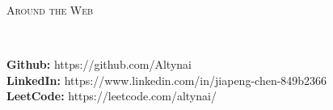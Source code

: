 ﻿\documentclass[9pt]{article}
\newenvironment{changemargin}[2]{%
  \begin{list}{}{%
    \setlength{\topsep}{0pt}%
    \setlength{\leftmargin}{#1}%
    \setlength{\rightmargin}{#2}%
    \setlength{\listparindent}{\parindent}%
    \setlength{\itemindent}{\parindent}%
    \setlength{\parsep}{\parskip}%
  }%
  \item[]}{\end{list}
}
\newcommand{\lineover}{
	\begin{changemargin}{-0.05in}{-0.05in}
		\vspace*{-8pt}
		\hrulefill \\
		\vspace*{-2pt}
	\end{changemargin}
}
\newcommand{\header}[1]{
	\begin{changemargin}{-0.5in}{-0.5in}
		\scshape{#1}\\
  	\lineover
	\end{changemargin}
}
\newenvironment{body} {
	\vspace*{-16pt}
	\begin{changemargin}{-0.25in}{-0.5in}
  }
	{\end{changemargin}
}
\begin{document}
\smallskip

\header{Around the Web}

\begin{body}
	\vspace{14pt}
    \textbf{Github:} https://github.com/Altynai \\
    \textbf{LinkedIn:} https://www.linkedin.com/in/jiapeng-chen-849b2366 \\
    \textbf{LeetCode:} https://leetcode.com/altynai/ \\
\end{body}
\end{document}
